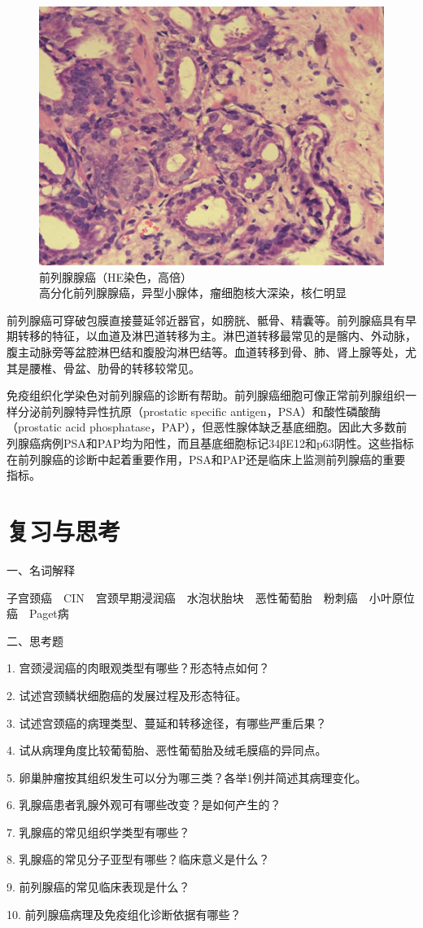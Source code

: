 \begin{figure}[!htbp]
 \centering
 \includegraphics{./images/Image00207.jpg}
 \captionsetup{justification=centering}
 \caption{前列腺腺癌（HE染色，高倍）\\ {\small 高分化前列腺腺癌，异型小腺体，瘤细胞核大深染，核仁明显}}
\label{fig11-19}
  \end{figure}

前列腺癌可穿破包膜直接蔓延邻近器官，如膀胱、骶骨、精囊等。前列腺癌具有早期转移的特征，以血道及淋巴道转移为主。淋巴道转移最常见的是髂内、外动脉，腹主动脉旁等盆腔淋巴结和腹股沟淋巴结等。血道转移到骨、肺、肾上腺等处，尤其是腰椎、骨盆、肋骨的转移较常见。

免疫组织化学染色对前列腺癌的诊断有帮助。前列腺癌细胞可像正常前列腺组织一样分泌前列腺特异性抗原（prostatic
specific antigen，PSA）和酸性磷酸酶（prostatic acid
phosphatase，PAP），但恶性腺体缺乏基底细胞。因此大多数前列腺癌病例PSA和PAP均为阳性，而且基底细胞标记34βE12和p63阴性。这些指标在前列腺癌的诊断中起着重要作用，PSA和PAP还是临床上监测前列腺癌的重要指标。

\section*{复习与思考}

{一、名词解释}

子宫颈癌　CIN　宫颈早期浸润癌　水泡状胎块　恶性葡萄胎　粉刺癌　小叶原位癌　Paget病

{二、思考题}

1. 宫颈浸润癌的肉眼观类型有哪些？形态特点如何？

2. 试述宫颈鳞状细胞癌的发展过程及形态特征。

3. 试述宫颈癌的病理类型、蔓延和转移途径，有哪些严重后果？

4. 试从病理角度比较葡萄胎、恶性葡萄胎及绒毛膜癌的异同点。

5. 卵巢肿瘤按其组织发生可以分为哪三类？各举1例并简述其病理变化。

6. 乳腺癌患者乳腺外观可有哪些改变？是如何产生的？

7. 乳腺癌的常见组织学类型有哪些？

8. 乳腺癌的常见分子亚型有哪些？临床意义是什么？

9. 前列腺癌的常见临床表现是什么？

10. 前列腺癌病理及免疫组化诊断依据有哪些？
